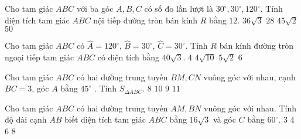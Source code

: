 \begin{vd}%
	Cho tam giác $ABC$ với ba góc $A,B,C$ có số đo lần lượt là $30^{\circ}, 30^{\circ}, 120^{\circ}$. Tính diện tích tam giác $ABC$ nội tiếp đường tròn bán kính $R$ bằng $12$.
	\choice
	{\True $36\sqrt{3}$}
	{$28$}
	{$45\sqrt{2}$}
	{$50$}
\end{vd}

\begin{vd}%
	Cho tam giác $ABC$ có $\widehat{A}=120^{\circ}$, $\widehat{B}=30^{\circ}$, $\widehat{C}=30^{\circ}$.  Tính $R$ bán kính đường tròn ngoại tiếp tam giác $ABC$ có diện tích bằng $40\sqrt{3}$.
	\choice
	{$4$}
	{\True $4\sqrt{10}$}
	{$5\sqrt{2}$}
	{$6$}
\end{vd}

\begin{vd}%
	Cho tam giác $ABC$ có hai đường trung tuyến $BM,CN$ vuông góc với nhau, cạnh $BC=3$, góc $A$ bằng $45^{\circ }$ . Tính $S_{\Delta ABC}.$ 
	\choice
	{$8$}
	{$10$}
	{\True$ 9$}
	{$11$}
\end{vd}

\begin{vd}%
	Cho tam giác $ABC$ có hai đường trung tuyến $AM,BN$ vuông góc với nhau. Tính độ dài cạnh $AB$ biết diện tích tam giác $ABC$ bằng $16\sqrt{3}$ và góc $C$ bằng $60^{\circ}$.
	\choice
	{$3$}
	{\True$4$}
	{$6$}
	{$8$}
\end{vd}
